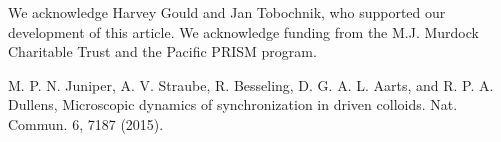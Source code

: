 \documentclass[prb,preprint]{revtex4}
\begin{document}
\begin{acknowledgments}

We acknowledge Harvey Gould and Jan Tobochnik, who supported our development of this article.  We acknowledge funding from the M.J. Murdock Charitable Trust and the Pacific PRISM program.

\end{acknowledgments}


\begin{thebibliography}{99}

 M. P. N. Juniper, A. V. Straube, R. Besseling, D. G. A. L. Aarts, and R. P. A. Dullens, Microscopic dynamics of synchronization in driven colloids. Nat. Commun. 6, 7187 (2015).











\end{thebibliography}
\end{document}
